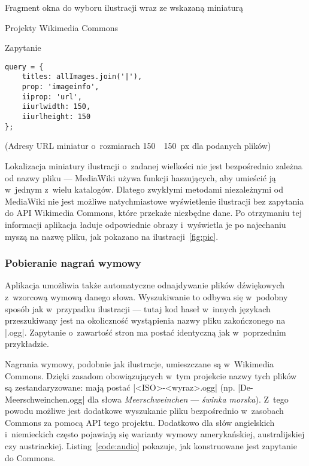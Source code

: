 \begin{illustration}
	\caption{Fragment okna do wyboru ilustracji wraz ze wskazaną miniaturą}
	\label{fig:pic}
\end{illustration}

\begin{opis}
\item[Projekty] Wikimedia Commons
\item[Zapytanie]
\begin{verbatim}
query = {
    titles: allImages.join('|'),
    prop: 'imageinfo',
    iiprop: 'url',
    iiurlwidth: 150,
    iiurlheight: 150
};
\end{verbatim}
(Adresy URL miniatur o~rozmiarach 150~\texttimes~150~px dla podanych plików)
\end{opis}

Lokalizacja miniatury ilustracji o~zadanej wielkości nie jest bezpośrednio zależna od nazwy pliku --- MediaWiki używa funkcji haszujących, aby umieścić ją w~jednym z~wielu katalogów. Dlatego zwykłymi metodami niezależnymi od MediaWiki nie jest możliwe natychmiastowe wyświetlenie ilustracji bez zapytania do API Wikimedia Commons, które przekaże niezbędne dane. Po otrzymaniu tej informacji aplikacja ładuje odpowiednie obrazy i~wyświetla je po najechaniu myszą na nazwę pliku, jak pokazano na ilustracji~\ref{fig:pic}.

\subsubsection{Pobieranie nagrań wymowy}
Aplikacja umożliwia także automatyczne odnajdywanie plików dźwiękowych z~wzorcową wymową danego słowa. Wyszukiwanie to odbywa się w~podobny sposób jak w~przypadku ilustracji --- tutaj kod haseł w~innych językach przeszukiwany jest na okoliczność wystąpienia nazwy pliku zakończonego na \kod|.ogg|. Zapytanie o~zawartość stron ma postać identyczną jak w~poprzednim przykładzie.

Nagrania wymowy, podobnie jak ilustracje, umieszczane są w~Wikimedia Commons. Dzięki zasadom obowiązujących w~tym projekcie nazwy tych plików są zestandaryzowane: mają postać \kod|<ISO>-<wyraz>.ogg| (np. \kod|De-Meerschweinchen.ogg| dla słowa \emph{Meerschweinchen} --- \emph{świnka morska}). Z~tego powodu możliwe jest dodatkowe wyszukanie pliku bezpośrednio w~zasobach Commons za pomocą API tego projektu. Dodatkowo dla słów angielskich i~niemieckich często pojawiają się warianty wymowy amerykańskiej, australijskiej czy austriackiej. Listing~\ref{code:audio} pokazuje, jak konstruowane jest zapytanie do Commons.

